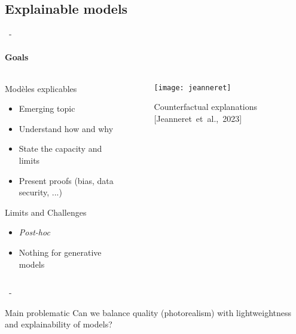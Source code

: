 \documentclass[aspectratio=169, 22pt]{beamer}
\begin{document}
\subsection{Explainable models}
\begin{frame}{\secname~- \subsecname}
  \framesubtitle{Goals}
  \begin{columns}
    \begin{column}{0.5\linewidth}
      \begin{block}{Modèles explicables}        
        \begin{itemize}
        \item \small Emerging topic
        \item \small Understand how and why
        \item \small State the capacity and limits
        \item \small Present proofs (bias, data security, ...)
        \end{itemize}
      \end{block}
      \begin{alertblock}{Limits and Challenges}
        \begin{itemize}
        \item \small \emph{Post-hoc}
        \item \small Nothing for generative models
        \end{itemize}
      \end{alertblock}
    \end{column}
    \begin{column}{0.5\linewidth}
      \begin{figure}
        \centering
        \texttt{[image: jeanneret]}
        \caption{{Counterfactual explanations [Jeanneret et al., 2023]}}
      \end{figure}
    \end{column}
  \end{columns}    
\end{frame}

\begin{frame}{\secname~- \subsecname}
  \begin{customblock}{\centering Main problematic}
    \centering
    Can we balance quality (photorealism) with lightweightness and explainability of models?
  \end{customblock}
\end{frame}
\end{document}
